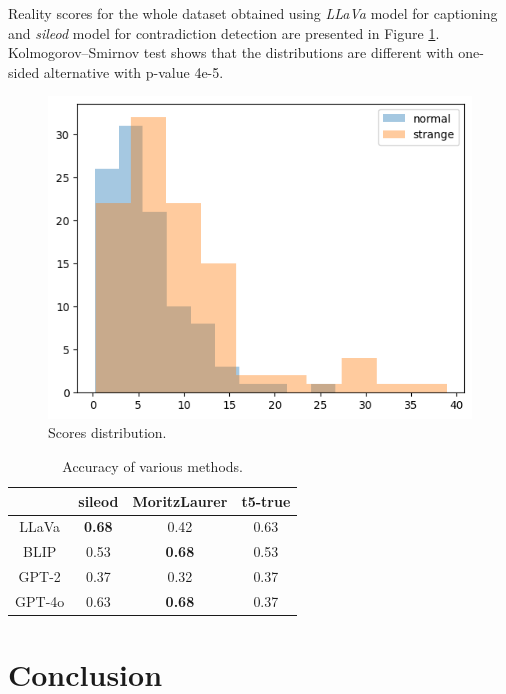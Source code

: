 \documentclass[11pt]{article}
\begin{document}
Reality scores for the whole dataset obtained using \textit{LLaVa} model for captioning and \textit{sileod} model for contradiction detection are presented in Figure \ref{fig:experiments}. Kolmogorov–Smirnov test shows that the distributions are different with one-sided alternative with p-value 4e-5.

\begin{figure}[ht]
  \includegraphics[width=\columnwidth]{images/output.png}
  \caption{Scores distribution.}
  \label{fig:experiments}
\end{figure}

\begin{table}[ht]
    \centering
    \begin{tabular}{c|c c c }
         & sileod & MoritzLaurer & t5-true \\
         \hline
         LLaVa & \textbf{0.68} & 0.42 & 0.63 \\
         BLIP & 0.53 &\textbf{ 0.68} & 0.53 \\
         GPT-2 & 0.37 & 0.32 & 0.37 \\
         GPT-4o & 0.63 & \textbf{0.68} & 0.37 \\
    \end{tabular}
    \caption{Accuracy of various methods.}
    \label{tab:acc}
\end{table}


\section{Conclusion}
\end{document}
